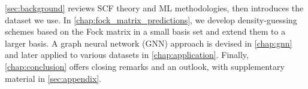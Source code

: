 \autoref{sec:background} reviews SCF theory and ML methodologies, then introduces the dataset we use. In \autoref{chap:fock_matrix_predictions}, we develop density-guessing schemes based on the Fock matrix in a small basis set and extend them to a larger basis. A graph neural network (GNN) approach is devised in \autoref{chap:gnn} and later applied to various datasets in \autoref{chap:application}. Finally, \autoref{chap:conclusion} offers closing remarks and an outlook, with supplementary material in \autoref{sec:appendix}.



